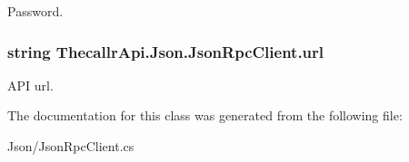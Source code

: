 Password. 

\hypertarget{class_thecallr_api_1_1_json_1_1_json_rpc_client_af0e422ceb48e0e60ea2931a60f5b3e29}{
\subsubsection[{url}]{\setlength{\rightskip}{0pt plus 5cm}string Thecallr\+Api.\+Json.\+Json\+Rpc\+Client.\+url\hspace{0.3cm}{\ttfamily [get]}}}\label{class_thecallr_api_1_1_json_1_1_json_rpc_client_af0e422ceb48e0e60ea2931a60f5b3e29}


A\+P\+I url. 



The documentation for this class was generated from the following file\+:\begin{DoxyCompactItemize}
\item 
Json/Json\+Rpc\+Client.\+cs\end{DoxyCompactItemize}
